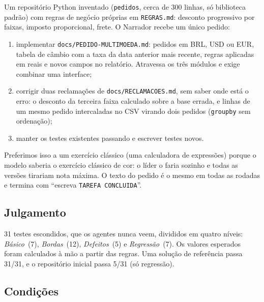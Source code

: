 \documentclass[11pt,a4paper]{article}
\begin{document}
Um repositório Python inventado (\texttt{pedidos}, cerca de 300 linhas, só biblioteca padrão) com
regras de negócio próprias em \texttt{REGRAS.md}: desconto progressivo por faixas, imposto
proporcional, frete. O Narrador recebe um único pedido:
\begin{enumerate}
\item implementar \texttt{docs/PEDIDO-MULTIMOEDA.md}: pedidos em BRL, USD ou EUR, tabela de câmbio
  com a taxa da data anterior mais recente, regras aplicadas em reais e novos campos no relatório.
  Atravessa os três módulos e exige combinar uma interface;
\item corrigir duas reclamações de \texttt{docs/RECLAMACOES.md}, sem saber onde está o erro: o
  desconto da terceira faixa calculado sobre a base errada, e linhas de um mesmo pedido
  intercaladas no CSV virando dois pedidos (\texttt{groupby} sem ordenação);
\item manter os testes existentes passando e escrever testes novos.
\end{enumerate}
Preferimos isso a um exercício clássico (uma calculadora de expressões) porque o modelo saberia o
exercício clássico de cor: o líder o faria sozinho e todas as versões tirariam nota máxima.
O texto do pedido é o mesmo em todas as rodadas e termina com ``escreva \texttt{TAREFA CONCLUIDA}''.

\subsection{Julgamento}

31 testes escondidos, que os agentes nunca veem, divididos em quatro níveis: \emph{Básico}~(7),
\emph{Bordas}~(12), \emph{Defeitos}~(5) e \emph{Regressão}~(7). Os valores esperados foram calculados
à mão a partir das regras. Uma solução de referência passa 31/31, e o repositório inicial passa 5/31
(só regressão).

\subsection{Condições}
\end{document}
